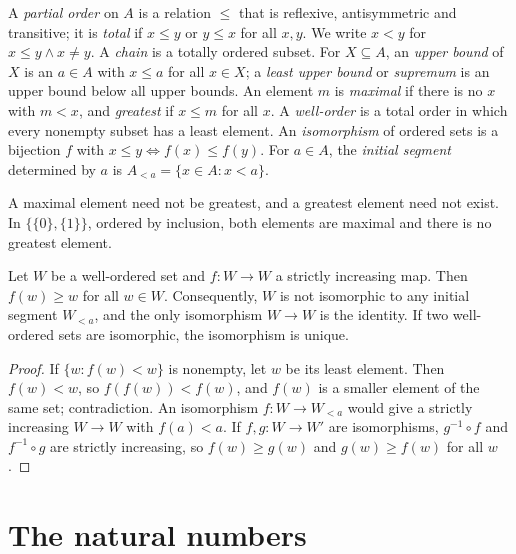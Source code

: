 \begin{definition}\label{sets:definition-orders}
A \emph{partial order} on $A$ is a relation $\leq$ that is reflexive,
antisymmetric and transitive; it is \emph{total} if $x \leq y$ or $y \leq x$
for all $x, y$. We write $x < y$ for $x \leq y \wedge x \neq y$. A \emph{chain}
is a totally ordered subset. For $X \subseteq A$, an \emph{upper bound} of $X$
is an $a \in A$ with $x \leq a$ for all $x \in X$; a \emph{least upper bound}
or \emph{supremum} is an upper bound below all upper bounds. An element $m$ is
\emph{maximal} if there is no $x$ with $m < x$, and \emph{greatest} if $x \leq m$
for all $x$. A \emph{well-order} is a total order in which every nonempty
subset has a least element. An \emph{isomorphism} of ordered sets is a
bijection $f$ with $x \leq y \iff f(x) \leq f(y)$. For $a \in A$, the
\emph{initial segment} determined by $a$ is $A_{<a} = \{x \in A : x < a\}$.
\end{definition}

\begin{counterexample}\label{sets:counterexample-maximal-not-greatest}
A maximal element need not be greatest, and a greatest element need not
exist. In $\{\{0\}, \{1\}\}$, ordered by inclusion, both elements are maximal
and there is no greatest element.
\end{counterexample}

\begin{lemma}\label{sets:lemma-well-order-rigid}
Let $W$ be a well-ordered set and $f \colon W \to W$ a strictly increasing map.
Then $f(w) \geq w$ for all $w \in W$. Consequently, $W$ is not isomorphic to
any initial segment $W_{<a}$, and the only isomorphism $W \to W$ is the
identity. If two well-ordered sets are isomorphic, the isomorphism is unique.
\end{lemma}

\begin{proof}
If $\{w : f(w) < w\}$ is nonempty, let $w$ be its least element. Then
$f(w) < w$, so $f(f(w)) < f(w)$, and $f(w)$ is a smaller element of the same
set; contradiction. An isomorphism $f \colon W \to W_{<a}$ would give a strictly
increasing $W \to W$ with $f(a) < a$. If $f, g \colon W \to W'$ are
isomorphisms, $g^{-1} \circ f$ and $f^{-1} \circ g$ are strictly increasing, so
$f(w) \geq g(w)$ and $g(w) \geq f(w)$ for all $w$.
\end{proof}

\section{The natural numbers}\label{sets:section-natural-numbers}

